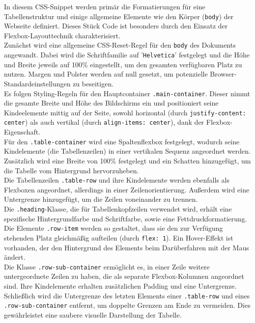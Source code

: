 \documentclass[./dokumentation.tex]{subfiles}
\begin{document}
In diesem CSS-Snippet werden primär die Formatierungen für eine Tabellenstruktur und einige allgemeine Elemente wie den Körper (\verb+body+) der Webseite definiert. Dieses Stück Code ist besonders durch den Einsatz der Flexbox-Layouttechnik charakterisiert.\\
Zunächst wird eine allgemeine CSS-Reset-Regel für den \verb+body+ des Dokuments angewandt. Dabei wird die Schriftfamilie auf '\verb+Helvetica+' festgelegt und die Höhe und Breite jeweils auf 100\% eingestellt, um den gesamten verfügbaren Platz zu nutzen. Margen und Polster werden auf null gesetzt, um potenzielle Browser-Standardeinstellungen zu beseitigen.\\
Es folgen Styling-Regeln für den Hauptcontainer \verb+.main-container+. Dieser nimmt die gesamte Breite und Höhe des Bildschirms ein und positioniert seine Kindeelemente mittig auf der Seite, sowohl horizontal (durch \verb+justify-content: center+) als auch vertikal (durch \verb+align-items: center+), dank der Flexbox-Eigenschaft.\\
Für den \verb+.table-container+ wird eine Spaltenflexbox festgelegt, wodurch seine Kindelemente (die Tabellenzeilen) in einer vertikalen Sequenz angeordnet werden. Zusätzlich wird eine Breite von 100\% festgelegt und ein Schatten hinzugefügt, um die Tabelle vom Hintergrund hervorzuheben.\\
Die Tabellenzeilen \verb+.table-row+ und ihre Kindelemente werden ebenfalls als Flexboxen angeordnet, allerdings in einer Zeilenorientierung. Außerdem wird eine Untergrenze hinzugefügt, um die Zeilen voneinander zu trennen.\\
Die \verb+.heading+-Klasse, die für Tabellenkopfzeilen verwendet wird, erhält eine spezifische Hintergrundfarbe und Schriftfarbe, sowie eine Fettdruckformatierung. \\
Die Elemente \verb+.row-item+ werden so gestaltet, dass sie den zur Verfügung stehenden Platz gleichmäßig aufteilen (durch \verb+flex: 1+). Ein Hover-Effekt ist vorhanden, der den Hintergrund des Elements beim Darüberfahren mit der Maus ändert.\\
Die Klasse \verb+.row-sub-container+ ermöglicht es, in einer Zeile weitere untergeordnete Zeilen zu haben, die als separate Flexbox-Kolumnen angeordnet sind. Ihre Kindelemente erhalten zusätzlichen Padding und eine Untergrenze.\\
Schließlich wird die Untergrenze des letzten Elements einer \verb+.table-row+ und eines\\ \verb+.row-sub-container+ entfernt, um doppelte Grenzen am Ende zu vermeiden. Dies gewährleistet eine saubere visuelle Darstellung der Tabelle.\\
\end{document}
